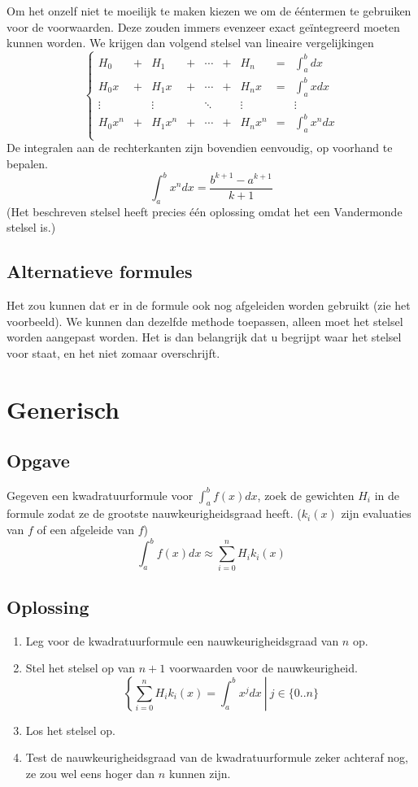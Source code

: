 \documentclass[12pt,a4paper]{article}
\begin{document}
Om het onzelf niet te moeilijk te maken kiezen we om de \'e\'entermen te gebruiken voor de voorwaarden. Deze zouden immers evenzeer exact ge\"integreerd moeten kunnen worden. We krijgen dan volgend stelsel van lineaire vergelijkingen
\[
\left\{
\begin{array}{ccccccccc}
H_0 &+& H_1 &+& \cdots &+& H_n &=& \int_{a}^{b}dx\\
H_0x &+& H_1x &+& \cdots &+& H_nx &=& \int_{a}^{b}xdx\\
\vdots && \vdots && \ddots && \vdots && \vdots\\
H_0x^n &+& H_1x^n &+& \cdots &+& H_nx^n &=& \int_{a}^{b}x^ndx\\
\end{array}
\right.
\]
De integralen aan de rechterkanten zijn bovendien eenvoudig, op voorhand te bepalen.
\[
\int_{a}^{b}x^ndx = \frac{b^{k+1}-a^{k+1}}{k+1}
\]
(Het beschreven stelsel heeft precies \'e\'en oplossing omdat het een Vandermonde stelsel is.)

\subsection{Alternatieve formules}
Het zou kunnen dat er in de formule ook nog afgeleiden worden gebruikt (zie het voorbeeld). We kunnen dan dezelfde methode toepassen, alleen moet het stelsel worden aangepast worden.
Het is dan belangrijk dat u begrijpt waar het stelsel voor staat, en het niet zomaar overschrijft.

\section{Generisch}
\subsection{Opgave}
Gegeven een kwadratuurformule voor $\int_{a}^{b}f(x)dx$, zoek de gewichten $H_i$ in de formule zodat ze de grootste nauwkeurigheidsgraad heeft. ($k_i(x)$ zijn evaluaties van $f$ of een afgeleide van $f$)
\[
\int_{a}^{b}f(x)dx \approx \sum_{i=0}^{n}H_ik_i(x)
\]

\subsection{Oplossing}
\begin{enumerate}
\item Leg voor de kwadratuurformule een nauwkeurigheidsgraad van $n$ op.
\item Stel het stelsel op van $n+1$ voorwaarden voor de nauwkeurigheid.
\[
\left\{
\sum_{i=0}^{n}H_ik_i(x) = \int_{a}^{b}x^jdx\ \right|\ j \in \{0..n\}
\]
\item Los het stelsel op.
\item Test de nauwkeurigheidsgraad van de kwadratuurformule zeker achteraf nog, ze zou wel eens hoger dan $n$ kunnen zijn.
\end{enumerate}
\end{document}
